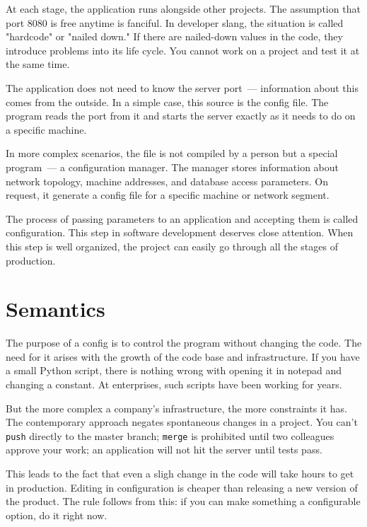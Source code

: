 At each stage, the application runs alongside other projects. The assumption that port 8080 is free anytime is fanciful. In developer slang, the situation is called "hardcode" or "nailed down." If there are nailed-down values in the code, they introduce problems into
its life cycle. You cannot work on a project and test it at the same time.

The application does not need to know the server port~--- information about this comes from the outside. In a simple case, this source is the config file. The program reads the port from it and starts the server exactly as it needs to do on a specific machine.


In more complex scenarios, the file is not compiled by a person but a special program~--- a configuration manager. The manager stores information about network topology, machine addresses, and database access parameters. On request, it generate a config file for a specific machine or network segment.

The process of passing parameters to an application and accepting them is called configuration. This step in software development deserves close attention. When this step is well organized, the project can easily go through all the stages of production.

\section{ Semantics}

The purpose of a config is to control the program without changing the code. The need for it arises with the growth of the code base and infrastructure. If you have a small Python script, there is nothing wrong with opening it in notepad and changing a constant. At enterprises, such scripts have been working for years.

But the more complex a company's infrastructure, the more constraints it has. The contemporary approach negates spontaneous changes in a project. You can't \verb|push| directly to the master branch; \verb|merge| is prohibited until two colleagues approve your work; an application will not hit the server until tests pass.

This leads to the fact that even a sligh change in the code will take hours to get in production. Editing in configuration is cheaper than releasing a new version of the product. The rule follows from this: if you can make something a configurable option, do it right now.

